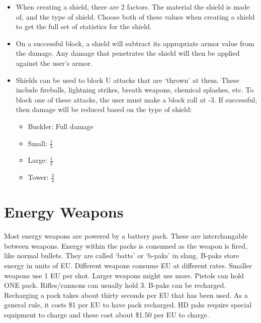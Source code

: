 \documentclass[twoside]{book}
\begin{document}
\begin{itemize}
      
  \item   When creating a shield, there are 2 factors. The
                 material the shield is made of, and the type of shield.
                 Choose both of these values when creating a shield to
                 get the full set of statistics for the shield. 
  \item   On a successful block, a shield will subtract its
                 appropriate armor value from the damage. Any damage that
                 penetrates the shield will then be applied against the
                 user's armor. 
  \item   Shields can be used to block U attacks that are
                `thrown' at them. These include fireballs,
                lightning strikes, breath weapons, chemical splashes,
                etc. To block one of these attacks, the user must make a
                block roll at -3. If successful, then damage will be
                reduced based on the type of shield:
                
\begin{itemize}
      
  \item   Buckler: Full damage 
  \item   Small: \ensuremath{\frac{ 1 }{ 4
                   }}
                  
  \item   Large: \ensuremath{\frac{ 1 }{ 2
                   }}
                  
  \item   Tower: \ensuremath{\frac{ 3 }{ 4
                   }}
                  
\end{itemize}
    
              
\end{itemize}
  
    

\section{Energy Weapons}
      Most energy weapons are powered by a battery pack.
             These are interchangable between weapons. Energy within the
             packs is consumed as the weapon is fired, like normal
             bullets. They are called `batts' or
             `b-paks' in slang. B-paks store energy in units
             of EU. Different weapons consume EU at different rates.
             Smaller weapons use 1 EU per shot. Larger weapons might use
             more. Pistols can hold ONE pack. Rifles/cannons can usually
             hold 3. B-paks can be recharged. Recharging a pack takes
             about thirty seconds per EU that has been used. As a general
             rule, it costs \$1 per EU to have pack recharged. HD paks
             require special equipment to charge and these cost about
             \$1.50 per EU to charge. 
    
\end{document}
